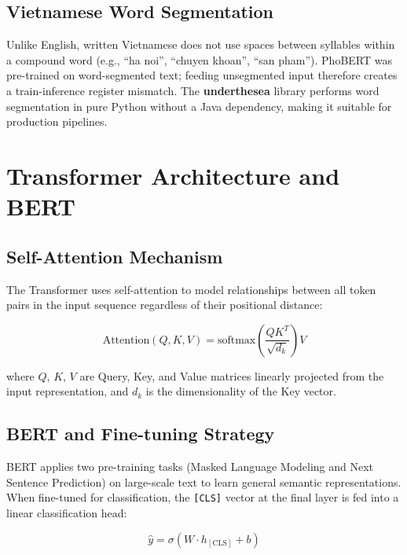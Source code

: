 \documentclass[12pt, a4paper]{report}
\begin{document}
\subsection{Vietnamese Word Segmentation}

Unlike English, written Vietnamese does not use spaces between syllables
within a compound word (e.g., ``ha noi'', ``chuyen khoan'', ``san pham'').
PhoBERT was pre-trained on word-segmented text;
feeding unsegmented input therefore creates a train-inference register mismatch.
The \textbf{underthesea} library \cite{underthesea} performs word segmentation
in pure Python without a Java dependency, making it suitable for production pipelines.

\section{Transformer Architecture and BERT}

\subsection{Self-Attention Mechanism}

The Transformer \cite{vaswani2017attention} uses self-attention to model
relationships between all token pairs in the input sequence
regardless of their positional distance:

\begin{equation}
  \text{Attention}(Q, K, V) = \text{softmax}\!\left(\frac{QK^T}{\sqrt{d_k}}\right)V
\end{equation}

where $Q$, $K$, $V$ are Query, Key, and Value matrices linearly projected
from the input representation, and $d_k$ is the dimensionality of the Key vector.

\subsection{BERT and Fine-tuning Strategy}

BERT \cite{devlin2019bert} applies two pre-training tasks
(Masked Language Modeling and Next Sentence Prediction) on large-scale text
to learn general semantic representations. When fine-tuned for classification,
the \texttt{[CLS]} vector at the final layer is fed into a linear classification head:

\begin{equation}
  \hat{y} = \sigma(W \cdot h_{[\text{CLS}]} + b)
\end{equation}
\end{document}
